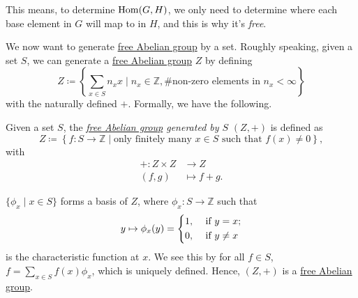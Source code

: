 \begin{remark}
	This means, to determine \(\operatorname{Hom} (G, H)\), we only need to determine where each base element in \(G\) will map to in \(H\), and this is why it's \emph{free}.
\end{remark}

We now want to generate \hyperref[def:free-Abelian-group]{free Abelian group} by a set. Roughly speaking, given a set \(S\), we can generate a \hyperref[def:free-Abelian-group]{free Abelian group} \(Z\)
by defining
\[
	Z\coloneqq \left\{\sum\limits_{x\in S}^{} n_{x} x\mid n_{x} \in \mathbb{Z} , \text{\# non-zero elements in \(n_x < \infty\)}\right\}
\]
with the naturally defined \(+\). Formally, we have the following.

\begin{definition}\label{def:free-Abelian-group-generated-by-sets}
	Given a set \(S\), the \emph{\hyperref[def:free-Abelian-group]{free Abelian group} generated by \(S\)} \((Z, +)\) is defined as
	\[
		Z\coloneqq \left\{f\colon S\to \mathbb{Z} \mid \text{only finitely many \(x\in S\) such that \(f(x)\neq 0\)}\right\},
	\]
	with
	\[
		\begin{split}
			+\colon Z\times Z & \to Z          \\
			(f, g)            & \mapsto f + g.
		\end{split}
	\]
\end{definition}

\begin{remark}
	\(\{\phi _{x} \mid x\in S\}\) forms a basis of \(Z\), where \(\phi _{x} \colon S\to \mathbb{Z} \) such that
	\[
		y\mapsto \phi _{x} (y) = \begin{dcases}
			1, & \text{ if } y=x ;    \\
			0, & \text{ if } y \neq x
		\end{dcases}
	\]
	is the characteristic function at \(x\). We see this by for all \(f\in S\), \(f = \sum\limits_{x\in S}^{} f(x)\phi _{x} \), which is uniquely defined. Hence, \((Z, +)\) is a \hyperref[def:free-Abelian-group]{free Abelian group}.
\end{remark}

